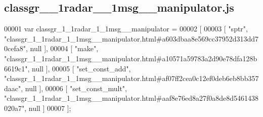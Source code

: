 \subsection{classgr\+\_\+\_\+1radar\+\_\+\_\+1msg\+\_\+\+\_\+manipulator.\+js}
\label{classgr__1__1radar__1__1msg____manipulator_8js_source}

\begin{DoxyCode}
00001 var classgr_1_1radar_1_1msg__manipulator =
00002 [
00003     [ \textcolor{stringliteral}{"sptr"}, \textcolor{stringliteral}{"classgr\_1\_1radar\_1\_1msg\_\_manipulator.html#a603dbaa8e569cc37952d313dd70cefa8"}, null ],
00004     [ \textcolor{stringliteral}{"make"}, \textcolor{stringliteral}{"classgr\_1\_1radar\_1\_1msg\_\_manipulator.html#a10571a59783a2d90e78dfa128b6619c1"}, null ],
00005     [ \textcolor{stringliteral}{"set\_const\_add"}, \textcolor{stringliteral}{"classgr\_1\_1radar\_1\_1msg\_\_manipulator.html#af07ff2cea0c12ef0deb6eb8bb357daac"}, null 
      ],
00006     [ \textcolor{stringliteral}{"set\_const\_mult"}, \textcolor{stringliteral}{"classgr\_1\_1radar\_1\_1msg\_\_manipulator.html#aaf8e76ed8a27f0a8de8d5461438020a7"}, null
       ]
00007 ];
\end{DoxyCode}
